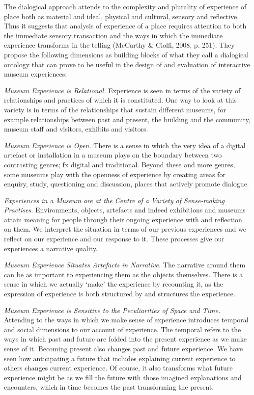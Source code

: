 The dialogical approach attends to the complexity and plurality of experience of place both as material and ideal, physical and cultural, sensory and reflective. Thus it suggests that analysis of experience of a place requires attention to both the immediate sensory transaction and the ways in which the immediate experience transforms in the telling (McCarthy & Ciolfi, 2008, p. 251). They propose the following dimensions as building blocks of what they call a dialogical ontology that can prove to be useful in the design of and evaluation of interactive museum experiences:

\emph{Museum Experience is Relational.} Experience is seen in terms of the variety of relationships and practices of which it is constituted. One way to look at this variety is in terms of the relationships that sustain different museums, for example relationships between past and present, the building and the community, museum staff and visitors, exhibits and visitors. 
\par
\emph{Museum Experience is Open.} There is a sense in which the very idea of a digital artefact or installation in a museum plays on the boundary between two contrasting genres; fx digital and traditional. Beyond these and more genres, some museums play with the openness of experience by creating areas for enquiry, study, questioning and discussion, places that actively promote dialogue.
\par
\emph{Experiences in a Museum are at the Centre of a Variety of Sense-making Practises.} Environments, objects, artefacts and indeed exhibitions and museums attain meaning for people through their ongoing experience with and reflection on them. We interpret the situation in terms of our previous experiences and we reflect on our experience and our response to it. These processes give our experiences a narrative quality.
\par
\emph{Museum Experience Situates Artefacts in Narrative.} The narrative around them can be as important to experiencing them as the objects themselves. There is a sense in which we actually ‘make’ the experience by recounting it, as the expression of experience is both structured by and structures the experience. 
\par
\emph{Museum Experience is Sensitive to the Peculiarities of Space and Time.} Attending to the ways in which we make sense of experience introduces temporal and social dimensions to our account of experience. The temporal refers to the ways in which past and future are folded into the present experience as we make sense of it. Becoming present also changes past and future experience. We have seen how anticipating a future that includes explaining current experience to others changes current experience. Of course, it also transforms what future experience might be as we fill the future with those imagined explanations and encounters, which in time becomes the past transforming the present. 

